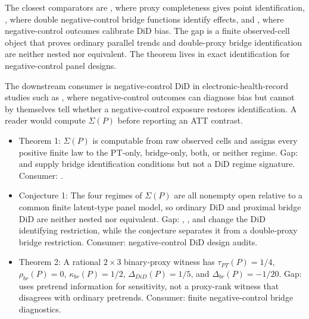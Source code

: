 \documentclass[11pt]{article}
\theoremstyle{definition}
\theoremstyle{plain}
\theoremstyle{remark}
\begin{document}
The closest comparators are \citet[Sec. 3]{MiaoGengTchetgen2018}, where proxy completeness gives point identification, \citet[Sec. 2]{MiaoShiLiTchetgen2024}, where double negative-control bridge functions identify effects, and \citet[Sec. 3]{ZhangZhangWangEtAl2025}, where negative-control outcomes calibrate DiD bias. The gap is a finite observed-cell object that proves ordinary parallel trends and double-proxy bridge identification are neither nested nor equivalent. The theorem lives in exact identification for negative-control panel designs.

The downstream consumer is negative-control DiD in electronic-health-record studies such as \citet{ZhangZhangWangEtAl2025}, where negative-control outcomes can diagnose bias but cannot by themselves tell whether a negative-control exposure restores identification. A reader would compute \(\Sigma(P)\) before reporting an ATT contrast.

\begin{itemize}[leftmargin=2em]
\item Theorem 1: \(\Sigma(P)\) is computable from raw observed cells and assigns every positive finite law to the PT-only, bridge-only, both, or neither regime. Gap: \citet{MiaoGengTchetgen2018} and \citet{MiaoShiLiTchetgen2024} supply bridge identification conditions but not a DiD regime signature. Consumer: \citet{ZhangZhangWangEtAl2025}.
\item Conjecture 1: The four regimes of \(\Sigma(P)\) are all nonempty open relative to a common finite latent-type panel model, so ordinary DiD and proximal bridge DiD are neither nested nor equivalent. Gap: \citet{SoferRichardsonColicinoSchwartzTchetgen2016}, \citet{RichardsonYeTchetgen2023}, and \citet{TchetgenParkRichardson2024} change the DiD identifying restriction, while the conjecture separates it from a double-proxy bridge restriction. Consumer: negative-control DiD design audits.
\item Theorem 2: A rational \(2\times3\) binary-proxy witness has \(\tau_{PT}(P)=1/4\), \(\rho_{br}(P)=0\), \(\kappa_{br}(P)=1/2\), \(\Delta_{DiD}(P)=1/5\), and \(\Delta_{br}(P)=-1/20\). Gap: \citet{RambachanRoth2023} uses pretrend information for sensitivity, not a proxy-rank witness that disagrees with ordinary pretrends. Consumer: finite negative-control bridge diagnostics.
\end{itemize}
\end{document}

